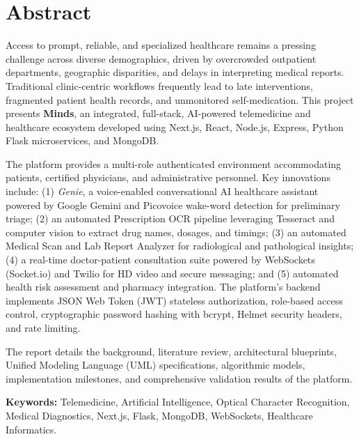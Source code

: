 \documentclass[12pt,a4paper]{report}
\begin{document}
\chapter*{Abstract}

Access to prompt, reliable, and specialized healthcare remains a pressing challenge across diverse demographics, driven by overcrowded outpatient departments, geographic disparities, and delays in interpreting medical reports. Traditional clinic-centric workflows frequently lead to late interventions, fragmented patient health records, and unmonitored self-medication. This project presents \textbf{Minds}, an integrated, full-stack, AI-powered telemedicine and healthcare ecosystem developed using Next.js, React, Node.js, Express, Python Flask microservices, and MongoDB.

\vspace{0.3cm}
\noindent The platform provides a multi-role authenticated environment accommodating patients, certified physicians, and administrative personnel. Key innovations include: (1) \textit{Genie}, a voice-enabled conversational AI healthcare assistant powered by Google Gemini and Picovoice wake-word detection for preliminary triage; (2) an automated Prescription OCR pipeline leveraging Tesseract and computer vision to extract drug names, dosages, and timings; (3) an automated Medical Scan and Lab Report Analyzer for radiological and pathological insights; (4) a real-time doctor-patient consultation suite powered by WebSockets (Socket.io) and Twilio for HD video and secure messaging; and (5) automated health risk assessment and pharmacy integration. The platform's backend implements JSON Web Token (JWT) stateless authorization, role-based access control, cryptographic password hashing with bcrypt, Helmet security headers, and rate limiting.

\vspace{0.3cm}
\noindent The report details the background, literature review, architectural blueprints, Unified Modeling Language (UML) specifications, algorithmic models, implementation milestones, and comprehensive validation results of the platform.

\vspace{0.5cm}
\noindent \textbf{Keywords:} Telemedicine, Artificial Intelligence, Optical Character Recognition, Medical Diagnostics, Next.js, Flask, MongoDB, WebSockets, Healthcare Informatics.

\cleardoublepage

\end{document}
